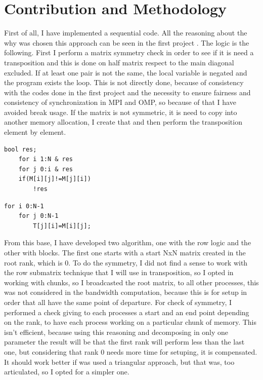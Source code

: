 \section{Contribution and Methodology}
First of all, I have implemented a sequential code. All the reasoning about the why was chosen this approach can be seen in the first project \cite{my_first_report}. The logic is the following. First I perform a matrix symmetry check in order to see if it is need a transposition and this is done on half matrix respect to the main diagonal excluded. If at least one pair is not the same, the local variable is negated and the program exists the loop. This is not directly done, because of consistency with the codes done in the first project and the necessity to ensure fairness and consistency of synchronization in MPI and OMP, so because of that I have avoided break usage.
If the matrix is not symmetric, it is need to copy into another memory allocation, I create that and then perform the transposition element by element. 
\begin{minipage}[!ht]{0.5\columnwidth} 
    \begin{lstlisting}[style=Cstyle, caption={CheckSym}]
    bool res;
    for i 1:N & res
    for j 0:i & res 
    if(M[i][j]!=M[j][i])
        !res 
    \end{lstlisting}
    \end{minipage}\hfill
    \begin{minipage}[!ht]{0.5\columnwidth}
    \begin{lstlisting}[style=Cstyle, caption={MatTranspose}]
    for i 0:N-1 
    for j 0:N-1 
        T[j][i]=M[i][j];
    \end{lstlisting}
    \end{minipage}
From this base, I have developed two algorithm, one with the row logic and the other with blocks.
The first one starts with a start NxN matrix created in the root rank, which is 0. To do the symmetry, I did not find a sense to work with the row submatrix technique that I will use in transposition, so I opted in working with chunks, so I broadcasted the root matrix, to all other processes, this was not considered in the bandwidth computation, because this is for setup in order that all have the same point of departure.
For check of symmetry, I performed a check giving to each processes a start and an end point depending on the rank, to have each process working on a particular chunk of memory. This isn't efficient, because using this reasoning and decomposing in only one parameter the result will be that the first rank will perform less than the last one, but considering that rank 0 needs more time for setuping, it is compensated. It should work better if was used a triangular approach, but that was, too articulated, so I opted for a simpler one.
